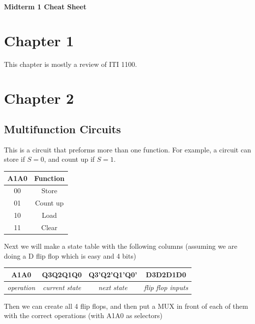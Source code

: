\documentclass[12pt,letterpaper]{article} \usepackage{amsmath} \usepackage{graphicx} \usepackage[margin=1in]{geometry} \usepackage{longtable}  \usepackage{amssymb}
\begin{document}
	
	\begin{center}
		\Large\textbf{Midterm 1 Cheat Sheet} \\
		\vspace{0.5em}
	\end{center}
	
		\section{Chapter 1}
		
		This chapter is mostly a review of ITI 1100.
		
		
		\section{Chapter 2}
		
		\subsection{Multifunction Circuits}
		This is a circuit that preforms more than one function. For example, a circuit can store if $S=0$, and count up if $S=1$.
		
		\begin{center}
			\begin{tabular}{|c|c|}
				\hline
				A1A0 & Function \\
				\hline
				00 & Store \\
				\hline
				01 & Count up \\
				\hline
				10 & Load \\
				\hline
				11 & Clear \\
				\hline
			\end{tabular}
		\end{center}
	
		Next we will make a state table with the following columns (assuming we are doing a D flip flop which is easy and 4 bits)
		
		\begin{center}
			\begin{tabular}{|c|c|c|c|}
				\hline
				A1A0 & Q3Q2Q1Q0 & Q3'Q2'Q1'Q0' & D3D2D1D0 \\
				\hline
				\textit{operation} & \textit{current state} & \textit{next state} & \textit{flip flop inputs} \\
				\hline
			\end{tabular}
		\end{center}
	
		Then we can create all 4 flip flops, and then put a MUX in front of each of them with the correct operations (with A1A0 as selectors)
		
\end{document}
